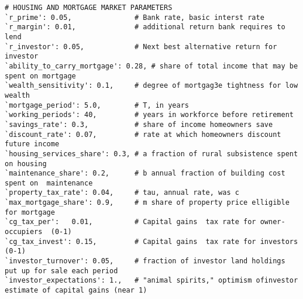 {\begin{verbatim}
# HOUSING AND MORTGAGE MARKET PARAMETERS
`r_prime': 0.05,               # Bank rate, basic interst rate
`r_margin': 0.01,              # additional return bank requires to lend
`r_investor': 0.05,            # Next best alternative return for investor
`ability_to_carry_mortgage': 0.28, # share of total income that may be spent on mortgage
`wealth_sensitivity': 0.1,     # degree of mortgag3e tightness for low wealth
`mortgage_period': 5.0,        # T, in years
`working_periods': 40,         # years in workforce before retirement
`savings_rate': 0.3,           # share of income homeowners save
`discount_rate': 0.07,         # rate at which homeowners discount future income
`housing_services_share': 0.3, # a fraction of rural subsistence spent on housing
`maintenance_share': 0.2,      # b annual fraction of building cost spent on  maintenance
`property_tax_rate': 0.04,     # tau, annual rate, was c
`max_mortgage_share': 0.9,     # m share of property price elligible for mortgage
`cg_tax_per':   0.01,          # Capital gains  tax rate for owner-occupiers  (0-1)
`cg_tax_invest': 0.15,         # Capital gains  tax rate for investors  (0-1)
`investor_turnover': 0.05,     # fraction of investor land holdings put up for sale each period
`investor_expectations': 1.,   # "animal spirits," optimism ofinvestor estimate of capital gains (near 1)

\end{verbatim} }